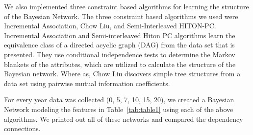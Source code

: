  
We also implemented three constraint based algorithms for learning the structure of the Bayesian Network.  The three constraint based algorithms we used were Incremental Association, Chow Liu, and Semi-Interleaved HITON-PC. Incremental Association and Semi-interleaved Hiton PC algorithms learn the equivalence class of a directed acyclic graph (DAG) from the data set that is presented.\cite{scutari2017package}  They use conditional independence tests to determine the Markov blankets of the attributes, which are utilized to calculate the structure of the Bayesian network. \cite{scutari2017package}  Where as, Chow Liu discovers simple tree structures from a data set using pairwise mutual information coefficients.\cite{scutari2017package}  

For every year data was collected (0, 5, 7, 10, 15, 20), we created a Bayesian Network modeling the features in Table~\ref{tab:table1} using each of the above algorithms. We printed out all of these networks and compared the dependency connections. 


